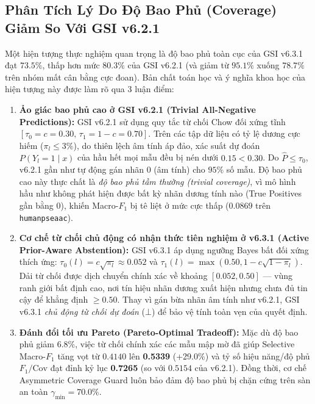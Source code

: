 \documentclass[10pt,a4paper,twoside]{article}
\begin{document}
\subsection{Phân Tích Lý Do Độ Bao Phủ (Coverage) Giảm So Với GSI v6.2.1}
Một hiện tượng thực nghiệm quan trọng là độ bao phủ toàn cục của GSI v6.3.1 đạt $73.5\%$, thấp hơn mức $80.3\%$ của GSI v6.2.1 (và giảm từ $95.1\%$ xuống $78.7\%$ trên nhóm mất cân bằng cực đoan). Bản chất toán học và ý nghĩa khoa học của hiện tượng này được làm rõ qua 3 luận điểm:
\begin{enumerate}[leftmargin=*]
    \item \textbf{Ảo giác bao phủ cao ở GSI v6.2.1 (Trivial All-Negative Predictions):} GSI v6.2.1 sử dụng quy tắc từ chối Chow đối xứng tĩnh $[\tau_0=c=0.30, \, \tau_1=1-c=0.70]$. Trên các tập dữ liệu có tỷ lệ dương cực hiếm ($\pi_l \le 3\%$), do thiên lệch âm tính áp đảo, xác suất dự đoán $P(Y_l=1 \mid x)$ của hầu hết mọi mẫu đều bị nén dưới $0.15 < 0.30$. Do $\hat{P} \le \tau_0$, v6.2.1 gần như tự động gán nhãn $0$ (âm tính) cho $95\%$ số mẫu. Độ bao phủ cao này thực chất là \textit{độ bao phủ tầm thường (trivial coverage)}, vì mô hình hầu như không phát hiện được bất kỳ nhãn dương tính nào (True Positives gần bằng $0$), khiến Macro-$F_1$ bị tê liệt ở mức cực thấp ($0.0869$ trên \texttt{humanpseaac}).
    \item \textbf{Cơ chế từ chối chủ động có nhận thức tiên nghiệm ở v6.3.1 (Active Prior-Aware Abstention):} GSI v6.3.1 áp dụng ngưỡng Bayes bất đối xứng thích ứng: $\tau_0(l) = c\sqrt{\pi_l} \approx 0.052$ và $\tau_1(l) = \max(0.50, 1 - c\sqrt{1-\pi_l})$. Dải từ chối được dịch chuyển chính xác về khoảng $[0.052, 0.50]$ --- vùng ranh giới bất định cao, nơi tín hiệu nhãn dương xuất hiện nhưng chưa đủ tin cậy để khẳng định $\ge 0.50$. Thay vì gán bừa nhãn âm tính như v6.2.1, GSI v6.3.1 \textit{chủ động từ chối dự đoán} ($\bot$) để bảo vệ tính toàn vẹn của quyết định.
    \item \textbf{Đánh đổi tối ưu Pareto (Pareto-Optimal Tradeoff):} Mặc dù độ bao phủ giảm $6.8\%$, việc từ chối chính xác các mẫu mập mờ đã giúp Selective Macro-$F_1$ tăng vọt từ $0.4140$ lên \textbf{0.5339} (+29.0\%) và tỷ số hiệu năng/độ phủ $F_1/\text{Cov}$ đạt đỉnh kỷ lục \textbf{0.7265} (so với $0.5154$ của v6.2.1). Đồng thời, cơ chế Asymmetric Coverage Guard luôn bảo đảm độ bao phủ bị chặn cứng trên sàn an toàn $\gamma_{\min} = 70.0\%$.
\end{enumerate}
\end{document}
